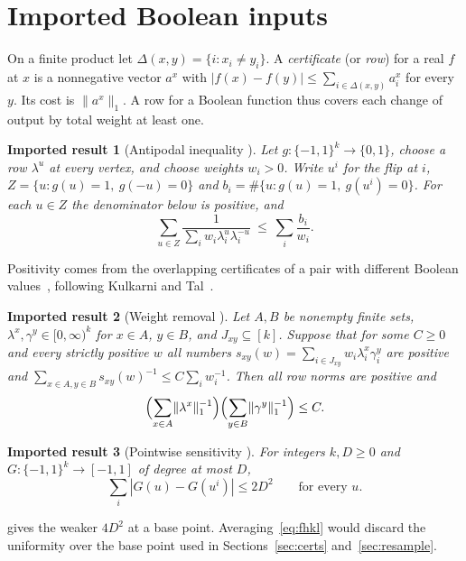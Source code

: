 \documentclass[11pt]{article}
\numberwithin{equation}{section}
\newcommand{\Qd}{\{-1,1\}^{k}}
\newcommand{\norm}[1]{\lVert #1\rVert_1}
\theoremstyle{plain}
\newtheorem*{imported}{Imported result}
\theoremstyle{remark}
\begin{document}
\section{Imported Boolean inputs}\label{sec:imported}
On a finite product let $\Delta(x,y)=\{i:x_i\ne y_i\}$. A \emph{certificate} (or \emph{row}) for a real $f$ at $x$ is a nonnegative vector $a^x$ with $|f(x)-f(y)|\le\sum_{i\in\Delta(x,y)}a_i^x$ for every $y$. Its cost is $\norm{a^x}$. A row for a Boolean function thus covers each change of output by total weight at least one.

\begin{imported}[Antipodal inequality {\cite[Theorem~4.3]{Tur26}}]
Let $g:\Qd\to\{0,1\}$, choose a row $\lambda^u$ at every vertex, and choose weights $w_i>0$. Write $u^i$ for the flip at $i$, $Z=\{u:g(u)=1,\ g(-u)=0\}$ and $b_i=\#\{u:g(u)=1,\ g(u^i)=0\}$. For each $u\in Z$ the denominator below is positive, and
\begin{equation}\label{eq:antipodal}
\sum_{u\in Z}\frac{1}{\sum_i w_i\lambda_i^u\lambda_i^{-u}}\ \le\ \sum_i\frac{b_i}{w_i}.
\end{equation}
\end{imported}
Positivity comes from the overlapping certificates of a pair with different Boolean values~\cite[Lemma~4.1]{Tur26}, following Kulkarni and Tal~\cite{KT16}.

\begin{imported}[Weight removal {\cite[Lemma~5.3]{Tur26}}]
Let $A,B$ be nonempty finite sets, $\lambda^x,\gamma^y\in[0,\infty)^k$ for $x\in A$, $y\in B$, and $J_{xy}\subseteq[k]$. Suppose that for some $C\ge0$ and every strictly positive $w$ all numbers $s_{xy}(w)=\sum_{i\in J_{xy}}w_i\lambda_i^x\gamma_i^y$ are positive and $\sum_{x\in A,y\in B}s_{xy}(w)^{-1}\le C\sum_iw_i^{-1}$. Then all row norms are positive and
\begin{equation}\label{eq:wr}
\Bigl(\sum_{x\in A}\norm{\lambda^x}^{-1}\Bigr)\Bigl(\sum_{y\in B}\norm{\gamma^y}^{-1}\Bigr)\le C.
\end{equation}
\end{imported}

\begin{imported}[Pointwise sensitivity {\cite[Theorem~3.3]{FHKL16}}]
For integers $k,D\ge0$ and $G:\Qd\to[-1,1]$ of degree at most $D$,
\begin{equation}\label{eq:fhkl}
\sum_i|G(u)-G(u^i)|\le 2D^2\qquad\text{for every }u.
\end{equation}
\end{imported}
\cite[Lemma~6.3]{Tur26} gives the weaker $4D^2$ at a base point. Averaging~\eqref{eq:fhkl} would discard the uniformity over the base point used in Sections~\ref{sec:certs} and~\ref{sec:resample}.
\end{document}
